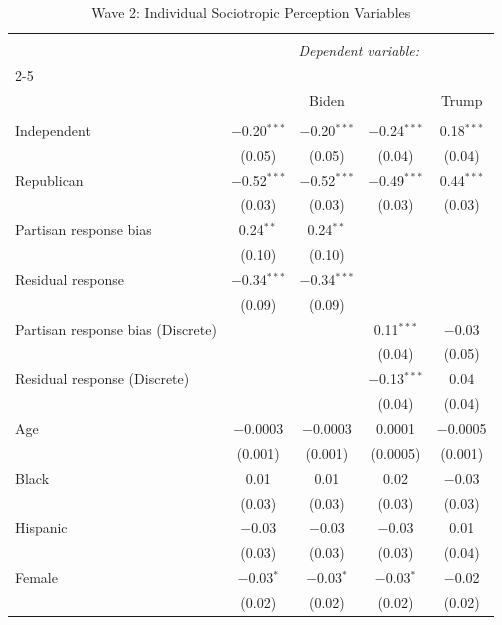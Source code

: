\documentclass{article}\usepackage[]{graphicx}\usepackage[]{xcolor}
\begin{document}
\begin{table}[H]
\centering
\caption{Wave 2: Individual Sociotropic Perception Variables}

\begin{tabular}{@{\extracolsep{5pt}}lcccc} 
\\[-1.8ex]\hline 
\hline \\[-1.8ex] 
 & \multicolumn{4}{c}{\textit{Dependent variable:}} \\ 
\cline{2-5} 
\\[-1.8ex] & \multicolumn{3}{c}{Biden} & Trump \\ 
\hline \\[-1.8ex] 
 Independent & $-$0.20$^{***}$ & $-$0.20$^{***}$ & $-$0.24$^{***}$ & 0.18$^{***}$ \\ 
  & (0.05) & (0.05) & (0.04) & (0.04) \\ 
  Republican & $-$0.52$^{***}$ & $-$0.52$^{***}$ & $-$0.49$^{***}$ & 0.44$^{***}$ \\ 
  & (0.03) & (0.03) & (0.03) & (0.03) \\ 
  Partisan response bias & 0.24$^{**}$ & 0.24$^{**}$ &  &  \\ 
  & (0.10) & (0.10) &  &  \\ 
  Residual response & $-$0.34$^{***}$ & $-$0.34$^{***}$ &  &  \\ 
  & (0.09) & (0.09) &  &  \\ 
  Partisan response bias (Discrete) &  &  & 0.11$^{***}$ & $-$0.03 \\ 
  &  &  & (0.04) & (0.05) \\ 
  Residual response (Discrete) &  &  & $-$0.13$^{***}$ & 0.04 \\ 
  &  &  & (0.04) & (0.04) \\ 
  Age & $-$0.0003 & $-$0.0003 & 0.0001 & $-$0.0005 \\ 
  & (0.001) & (0.001) & (0.0005) & (0.001) \\ 
  Black & 0.01 & 0.01 & 0.02 & $-$0.03 \\ 
  & (0.03) & (0.03) & (0.03) & (0.03) \\ 
  Hispanic & $-$0.03 & $-$0.03 & $-$0.03 & 0.01 \\ 
  & (0.03) & (0.03) & (0.03) & (0.04) \\ 
  Female & $-$0.03$^{*}$ & $-$0.03$^{*}$ & $-$0.03$^{*}$ & $-$0.02 \\ 
  & (0.02) & (0.02) & (0.02) & (0.02) \\ 

\end{tabular}
\end{table}
\end{document}
